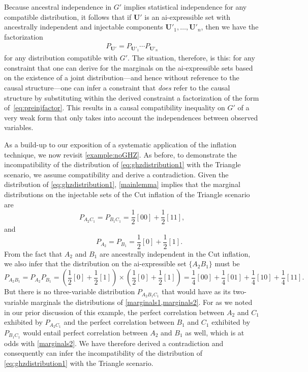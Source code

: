 \documentclass[aps,english,10pt,superscriptaddress,onecolumn,twoside,longbibliography,pra,floatfix,fleqn,nofootinbib]{revtex4-1}
\theoremstyle{definition}
\newcounter{example}[section]
\begin{document}
Because ancestral independence in $G'$ implies statistical independence for any compatible distribution, it follows that if $\bm{U}'$ is an ai-expressible set with ancestrally independent and injectable components $\bm{U}'_1,\ldots,\bm{U}'_n$, then we have the factorization
\begin{align}\label{eq:preinjfactor}
P_{\bm{U}'} = P_{\bm{U}'_1} \cdots P_{\bm{U}'_n}
\end{align}
for any distribution compatible with $G'$. The situation, therefore, is this: for any constraint that one can derive for the marginals on the ai-expressible sets based on the existence of a joint distribution---and hence without reference to the causal structure---one can infer a constraint that {\em does} refer to the causal structure by substituting within the derived constraint a factorization of the form of~\cref{eq:preinjfactor}. This results in a causal compatibility inequality on $G'$ of a very weak form that only takes into account the independences between observed variables.



As a build-up to our exposition of a systematic application of the inflation technique, we now revisit \cref{example:noGHZ}.  As before, to demonstrate the incompatibility of the distribution of \cref{eq:ghzdistribution1} with the Triangle scenario, we assume compatibility and derive a contradiction.  Given the distribution of \cref{eq:ghzdistribution1}, \cref{mainlemma} implies that the marginal distributions on the injectable sets of the Cut inflation of the Triangle scenario are 
\begin{equation}
P_{A_2 C_1} = P_{B_1 C_1} = \frac{1}{2} [00] +\frac{1}{2} [11], 
\label{marginals1}
\end{equation}
and
\begin{equation}
\qquad P_{A_2} = P_{B_1}=\frac{1}{2} [0] +\frac{1}{2} [1].
\label{marginals1prime}
\end{equation}
From the fact that $A_2$ and $B_1$ are ancestrally independent in the Cut inflation, we also infer that the distribution on the ai-expressible set $\{A_2 B_1\}$ must be
\begin{equation}
P_{A_2 B_1} = P_{A_2}P_{B_1} = \left(\frac{1}{2} [0] +\frac{1}{2} [1]\right)\times\left(\frac{1}{2} [0] +\frac{1}{2} [1]\right)=\frac{1}{4} [00]+\frac{1}{4} [01]+\frac{1}{4} [10]+\frac{1}{4} [11].
\label{marginals2}
\end{equation}
But there is no three-variable distribution $P_{A_2 B_1 C_1}$ that would have as its two-variable marginals the distributions of \cref{marginals1,marginals2}. For as we noted in our prior discussion of this example, the perfect correlation between $A_2$ and $C_1$ exhibited by $P_{A_2 C_1}$ and the perfect correlation between $B_1$ and $C_1$ exhibited by $P_{B_1 C_1}$ would entail perfect correlation between $A_2$ and $B_1$ as well, which is at odds with \eqref{marginals2}. 
We have therefore derived a contradiction and consequently can infer the incompatibility of the distribution of \cref{eq:ghzdistribution1} with the Triangle scenario.
\end{document}
